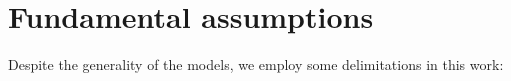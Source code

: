\documentclass[a4paper,fleqn]{cas-sc}
\begin{document}




\section{Fundamental assumptions}\label{}

Despite the generality of the models, we employ some delimitations in this work:
\end{document}
